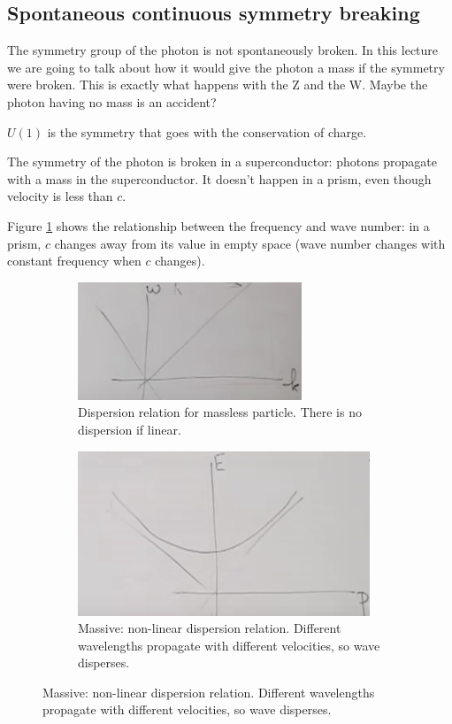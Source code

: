 \documentclass[]{article}
\begin{document}
\subsection{Spontaneous continuous symmetry breaking}
The symmetry group of the photon is not spontaneously broken. In this lecture we are going to talk about how it would give the photon a mass if the symmetry were broken. This is exactly what happens with the Z and the W. Maybe the photon having no mass is an accident?

$U(1)$ is the symmetry that goes with the conservation of charge.

The symmetry of the photon is broken in a superconductor: photons propagate with a mass in the superconductor. It doesn't happen in a prism, even though velocity is less than $c$.

Figure \ref{fig:2-8-massless} shows the relationship between the frequency and wave number: in a prism, $c$ changes away from its value in empty space (wave number changes with constant frequency when $c$ changes). 

\begin{figure}[H]
	\caption{Dispersion relations for Massive and Massless particles}
	\begin{subfigure}[t]{0.45\textwidth}
		\caption{Dispersion relation for massless particle. There is no dispersion if linear.}\label{fig:2-8-massless}
		\includegraphics[width=\textwidth]{2-8-massless}
	\end{subfigure}
	\begin{subfigure}[t]{0.45\textwidth}
		\caption{Massive: non-linear dispersion relation. Different wavelengths propagate with different velocities, so wave disperses.}\label{fig:2-8-massive}
		\includegraphics[width=\textwidth]{2-8-massive}
	\end{subfigure}
\end{figure}
\end{document}
